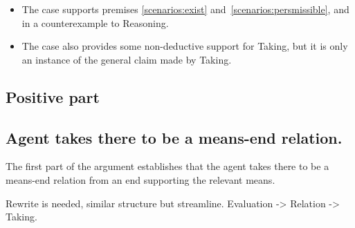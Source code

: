 \documentclass[10pt]{article}
\newcommand{\hozlinedash}[0]{%
  \noindent\hdashrule[0.5ex][c]{\textwidth}{.1pt}{2.5pt}
}
\newcommand{\schemaName}[1]{\textsf{#1}}
\begin{document}
\begin{itemize}
\item The case supports premises \ref{scenarios:exist} and~\ref{scenarios:persmissible}, and in a counterexample to \schemaName{Reasoning}.
\item The case also provides some non-deductive support for \schemaName{Taking}, but it is only an instance of the general claim made by \schemaName{Taking}.
\end{itemize}


\newpage

\subsection{Positive part}
\label{sec:positive-part}

\subsection{Agent takes there to be a means-end relation.}
\label{sec:means-end-relation}

The first part of the argument establishes that the agent takes there to be a means-end relation from an end supporting the relevant means.

{\color{red} Rewrite is needed, similar structure but streamline.
Evaluation -> Relation -> Taking.}

\hozlinedash
\end{document}
